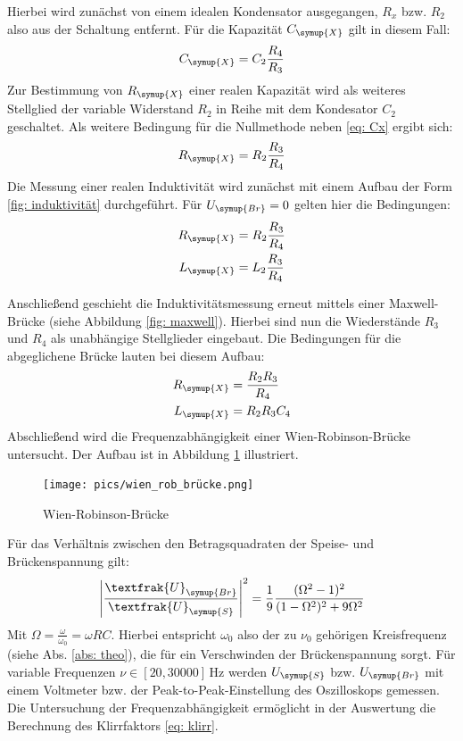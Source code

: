 Hierbei wird zunächst von einem idealen Kondensator ausgegangen, $R_x$ bzw. $R_2$ also aus der Schaltung entfernt. Für die
Kapazität $C_{\symup{X}}$ gilt in diesem Fall:
\begin{equation}
  C_{\symup{X}} = C_2 \frac{R_4}{R_3}
  \label{eq: Cx}
\end{equation}
Zur Bestimmung von $R_{\symup{X}}$ einer realen Kapazität wird als weiteres Stellglied der variable Widerstand $R_2$ in Reihe mit dem Kondesator $C_2$
geschaltet. Als weitere Bedingung für die Nullmethode neben \eqref{eq: Cx} ergibt sich:
\begin{equation}
  R_{\symup{X}} = R_2\frac{R_3}{R_4}
  \label{eq: Rx}
\end{equation}
Die Messung einer realen Induktivität wird zunächst mit einem Aufbau der Form \ref{fig: induktivität} durchgeführt.
Für $U_{\symup{Br}} = 0$ gelten hier die Bedingungen:
\begin{align}
  \begin{aligned}
    R_{\symup{X}} &= R_2\frac{R_3}{R_4} \\
    L_{\symup{X}} &= L_2\frac{R_3}{R_4}
  \end{aligned}
  \label{eq: Lx}
\end{align}

Anschließend geschieht die Induktivitätsmessung erneut mittels einer Maxwell-Brücke (siehe Abbildung \ref{fig: maxwell}).
Hierbei sind nun die Wiederstände $R_3$ und $R_4$ als unabhängige Stellglieder eingebaut. Die Bedingungen für die abgeglichene Brücke lauten
bei diesem Aufbau:
\begin{align}
  \begin{aligned}
    R_{\symup{X}} &=\frac{R_2 R_3}{R_4} \\
    L_{\symup{X}} &= R_2 R_3 C_4
  \end{aligned}
  \label{eq: Lx_maxwell}
\end{align}
Abschließend wird die Frequenzabhängigkeit einer Wien-Robinson-Brücke untersucht. Der Aufbau ist in Abbildung
 \ref{fig: wienrob} illustriert.
\begin{figure}
  \centering
  \texttt{[image: pics/wien\_rob\_brücke.png]}
  \caption{Wien-Robinson-Brücke\cite{anleitung302}}
  \label{fig: wienrob}
\end{figure}
Für das Verhältnis zwischen den Betragsquadraten der Speise- und Brückenspannung gilt:
\begin{equation}
\label{eq:wien_theo}
  \left| \frac{\textfrak{U}_{\symup{Br}}}{\textfrak{U}_{\symup{S}}}\right|^2 = \frac{1}{9} \frac{(\Omega^2 - 1)^2 }{(1 - \Omega ^2)^2 + 9 \Omega ^2}
\end{equation}
Mit $\Omega = \frac{\omega}{\omega_0} = \omega R C$. Hierbei entspricht $\omega_0$ also der zu $\nu_0$ gehörigen Kreisfrequenz (siehe Abs. \ref{abs: theo}), die
für ein Verschwinden der Brückenspannung sorgt. Für variable Frequenzen $\nu \in [20, \num{30000}]\,\si{\hertz}$ werden $U_{\symup{S}}$ bzw. $U_{\symup{Br}}$ mit einem
Voltmeter bzw. der Peak-to-Peak-Einstellung des Oszilloskops gemessen. Die Untersuchung der Frequenzabhängigkeit %
 ermöglicht in der Auswertung die Berechnung des Klirrfaktors \eqref{eq: klirr}. %
